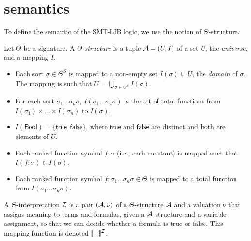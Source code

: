 \section{semantics}

To define the semantic of the SMT-LIB logic, we use the notion of $\Theta$-structure.

\begin{definition}
Let $\Theta$ be a signature.  
A \emph{$\Theta$-structure} is a tuple $\cal{A} = (U, I)$ of a set $U$, the \emph{universe}, and a mapping $I$.
\begin{itemize}
    \item Each sort $\sigma \in \Theta^{S}$ is mapped to a non-empty set $I(\sigma) \subseteq U$, the \emph{domain} of $\sigma$.  
    The mapping is such that $U = \bigcup_{\sigma \in \Theta^{S}} I(\sigma)$.
    \item For each sort $\sigma_1 \dots \sigma_n \sigma$, $I(\sigma_1 \dots \sigma_n \sigma)$ is the set of total functions from $I(\sigma_1) \times \dots \times I(\sigma_n)$ to $I(\sigma)$.
    \item $I(\mathsf{Bool}) = \{\mathsf{true}, \mathsf{false}\}$, where $\mathsf{true}$ and $\mathsf{false}$ are distinct and both are elements of $U$.
    \item Each ranked function symbol $f : \sigma$ (i.e., each constant) is mapped such that $I(f : \sigma) \in I(\sigma)$.
    \item Each ranked function symbol $f : \sigma_1 \dots \sigma_n \sigma \in \Theta$ is mapped to a total function from $I(\sigma_1 \dots \sigma_n \sigma)$.
\end{itemize}
\end{definition}



A $\Theta$-interpretation $\cal{I}$ is a pair $(\cal{A}, \nu)$ of a $\Theta$-structure $\cal{A}$ and a valuation $\nu$
that assigns meaning to terms and formulas, given a $\cal{A}$ structure and a variable assignment, so that we can decide whether a formula is true or false.
This mapping  function is denoted $\llbracket \_ \rrbracket^{\cal{I}}$.

